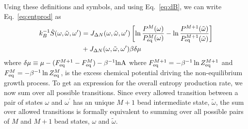 \documentclass[amsmath,preprintnumbers,10pt,nofootinbib,prl,twocolumn]{revtex4-1}
\begin{document}
Using these definitions and symbols, and using Eq.~\ref{eq:dB}, we can write Eq.~\ref{eq:entprod} as 
\begin{equation}
\label{eq:entprod2}
    \begin{split}
      k_B^{-1}\dot{S}(\omega,\tilde\omega,\omega^\prime)&=J_{\Delta N}(\omega,\tilde\omega,\omega^\prime)\left[\ln\frac{P^M(\omega)}{P_{\rm eq}^M(\omega)}-\ln\frac{P^{M+1}(\tilde\omega)}{P_{\rm eq}^{M+1}(\tilde\omega)}\right]\\&+J_{\Delta N}(\omega,\tilde\omega,\omega^\prime)\beta\delta \mu
    \end{split}
\end{equation}
where $\delta \mu\equiv \mu- (F^{M+1}_{\rm eq}-F^M_{\rm eq})-\beta^{-1}\rm{ln}A$ where $F^{M+1}_{\rm eq}=-\beta^{-1}\ln Z^{M+1}_{\rm eq}$ and $F^{M}_{\rm eq}=-\beta^{-1}\ln Z^{M}_{\rm eq}$, is the excess chemical potential driving the non-equilibrium growth process. 
To get an expression for the overall entropy production rate, we now sum over all possible transitions. Since every allowed transition between a pair of states $\omega$ and $\omega^\prime$ has an unique $M+1$ bead intermediate state, $\tilde \omega$, the sum over allowed transitions is formally equivalent to summing over all possible pairs of $M$ and $M+1$ bead states, $\omega$ and $\tilde\omega$. 
\end{document}
